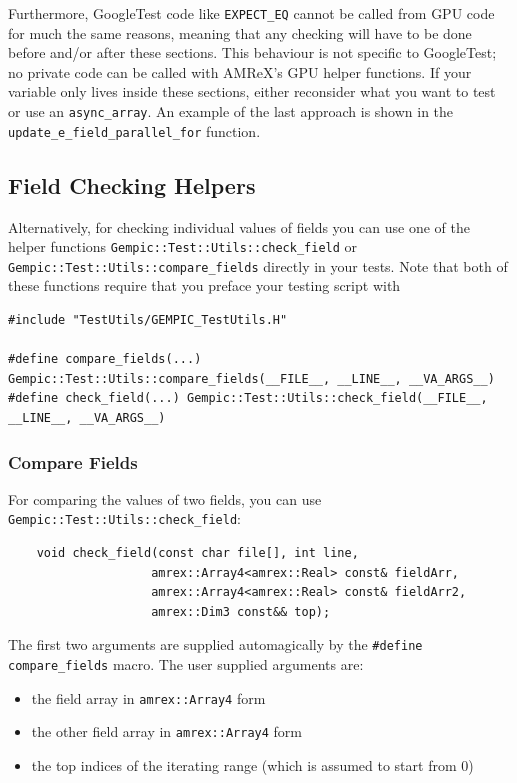 \documentclass[11pt]{article}
\newcommand{\gt}{GoogleTest}
\begin{document}
Furthermore, \gt{} code like \lstinline{EXPECT_EQ} cannot be called from GPU code for much the same reasons, meaning that any checking will have to be done before and/or after these sections. This behaviour is not specific to \gt{}; no private code can be called with AMReX's GPU helper functions. If your variable only lives inside these sections, either reconsider what you want to test or use an \lstinline{async_array}. An example of the last approach is shown in the \lstinline{update_e_field_parallel_for} function.

\subsection{Field Checking Helpers}
Alternatively, for checking individual values of fields you can use one of the helper functions \lstinline{Gempic::Test::Utils::check_field} or \lstinline{Gempic::Test::Utils::compare_fields} directly in your tests. Note that both of these functions require that you preface your testing script with
\begin{lstlisting}
#include "TestUtils/GEMPIC_TestUtils.H"

#define compare_fields(...) Gempic::Test::Utils::compare_fields(__FILE__, __LINE__, __VA_ARGS__)
#define check_field(...) Gempic::Test::Utils::check_field(__FILE__, __LINE__, __VA_ARGS__)
\end{lstlisting}

\subsubsection*{Compare Fields}
For comparing the values of two fields, you can use \lstinline{Gempic::Test::Utils::check_field}:
\begin{lstlisting}
    void check_field(const char file[], int line,
                    amrex::Array4<amrex::Real> const& fieldArr,
                    amrex::Array4<amrex::Real> const& fieldArr2,
                    amrex::Dim3 const&& top);
\end{lstlisting}
The first two arguments are supplied automagically by the \lstinline{#define compare_fields} macro.
The user supplied arguments are:
\begin{itemize}
    \item the field array in \lstinline{amrex::Array4} form
    \item the other field array in \lstinline{amrex::Array4} form
    \item the top indices of the iterating range (which is assumed to start from $0$)
\end{itemize}
\end{document}
